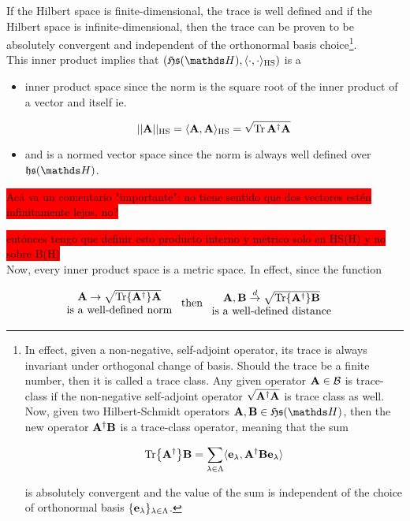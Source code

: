 \documentclass{homework}
\begin{document}
If the Hilbert space is finite-dimensional, the trace is well defined and if the Hilbert space is infinite-dimensional, then the trace can be proven to be absolutely convergent and independent of the orthonormal basis choice\footnote{In effect, given a non-negative, self-adjoint operator, its trace is always invariant under orthogonal change of basis. Should the trace be a finite number, then it is called a trace class. Any given operator ${\bf A} \in \mathcal{B}$ is trace-class if the non-negative self-adjoint operator $\sqrt{{\bf A^\dagger} {\bf A}}$ is trace class as well. Now, given two Hilbert-Schmidt operators ${\bf A}, {\bf B} \in \mathfrak{H}\mathfrak{s}(\hilbert)$, then the new operator $\bf A^\dagger{\bf B}$ is a trace-class operator, meaning that the sum 

$$
\Tr {\bf A^\dagger}{\bf B} = \sum_{\lambda \in \Lambda} \langle {\bf e}_{\lambda}, {\bf A^\dagger}{\bf B} {\bf e}_{\lambda} \rangle 
$$

is absolutely convergent and the value of the sum is independent of the choice of orthonormal basis $\{{\bf e}_{\lambda}\}_{\lambda \in \Lambda}$. 
}. \\

This inner product implies that $(\mathfrak{H}\mathfrak{s}(\hilbert), \langle \cdot , \cdot \rangle_{\textnormal{HS}})$ is a

\begin{itemize}
    \item inner product space since the norm is the square root of the inner product of a vector and itself ie.
    
    $$
    ||{\bf A}||_{\textnormal{HS}} = \langle {\bf A} , {\bf A} \rangle_{\textnormal{HS}} = \sqrt{\Tr \bf A^\dagger {\bf A}}
    $$
    
    \item and is a normed vector space since the norm is always well defined over $\mathfrak{h}\mathfrak{s}(\hilbert)$. 
\end{itemize}

\colorbox{red}{Acá va un comentario "importante": no tiene sentido que dos vectores estén infinitamente lejos, no?} 

\colorbox{red}{entónces tengo que definir esto producto interno y métrico solo en HS(H) y no sobre B(H)} \\

Now, every inner product space is a metric space. In effect, since the function 

\begin{align*}
    \begin{array}{c}
         {\bf A} \rightarrow \sqrt{\Tr {\bf A^\dagger}{\bf A}}  \\
         \textnormal{is a well-defined norm}  
    \end{array} & \textnormal{ then }  \begin{array}{c}
         {\bf A}, {\bf B} \overset{d}{\rightarrow} \sqrt{\Tr {\bf A^\dagger}{\bf B}}  \\
         \textnormal{is a well-defined distance}
    \end{array}
\end{align*}
\end{document}
